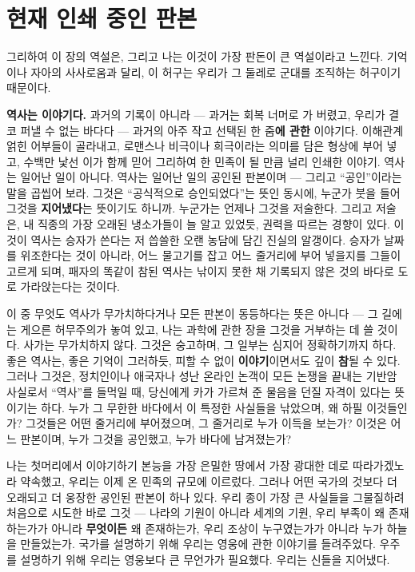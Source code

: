 \section*{현재 인쇄 중인 판본}

그리하여 이 장의 역설은, 그리고 나는 이것이 가장 판돈이 큰 역설이라고 느낀다. 기억이나 자아의 사사로움과 달리, 이 허구는 우리가 그 둘레로 군대를 조직하는 허구이기 때문이다.

\textbf{역사는 이야기다.} 과거의 기록이 아니라 — 과거는 회복 너머로 가 버렸고, 우리가 결코 퍼낼 수 없는 바다다 — 과거의 아주 작고 선택된 한 줌\textbf{에 관한} 이야기다. 이해관계 얽힌 어부들이 골라내고, 로맨스나 비극이나 희극이라는 의미를 담은 형상에 부어 넣고, 수백만 낯선 이가 함께 믿어 그리하여 한 민족이 될 만큼 널리 인쇄한 이야기. 역사는 일어난 일이 아니다. 역사는 일어난 일의 공인된 판본이며 — 그리고 ``공인''이라는 말을 곱씹어 보라. 그것은 ``공식적으로 승인되었다''는 뜻인 동시에, 누군가 붓을 들어 그것을 \textbf{지어냈다}는 뜻이기도 하니까. 누군가는 언제나 그것을 저술한다. 그리고 저술은, 내 직종의 가장 오래된 냉소가들이 늘 알고 있었듯, 권력을 따르는 경향이 있다. 이것이 역사는 승자가 쓴다는 저 씁쓸한 오랜 농담에 담긴 진실의 알갱이다. 승자가 날짜를 위조한다는 것이 아니라, 어느 물고기를 잡고 어느 줄거리에 부어 넣을지를 그들이 고르게 되며, 패자의 똑같이 참된 역사는 낚이지 못한 채 기록되지 않은 것의 바다로 도로 가라앉는다는 것이다.

이 중 무엇도 역사가 무가치하다거나 모든 판본이 동등하다는 뜻은 아니다 — 그 길에는 게으른 허무주의가 놓여 있고, 나는 과학에 관한 장을 그것을 거부하는 데 쓸 것이다. 사가는 무가치하지 않다. 그것은 숭고하며, 그 일부는 심지어 정확하기까지 하다. 좋은 역사는, 좋은 기억이 그러하듯, 피할 수 없이 \textbf{이야기}이면서도 깊이 \textbf{참}될 수 있다. 그러나 그것은, 정치인이나 애국자나 성난 온라인 논객이 모든 논쟁을 끝내는 기반암 사실로서 ``역사''를 들먹일 때, 당신에게 카가 가르쳐 준 물음을 던질 자격이 있다는 뜻이기는 하다. 누가 그 무한한 바다에서 이 특정한 사실들을 낚았으며, 왜 하필 이것들인가? 그것들은 어떤 줄거리에 부어졌으며, 그 줄거리로 누가 이득을 보는가? 이것은 어느 판본이며, 누가 그것을 공인했고, 누가 바다에 남겨졌는가?

나는 첫머리에서 이야기하기 본능을 가장 은밀한 땅에서 가장 광대한 데로 따라가겠노라 약속했고, 우리는 이제 온 민족의 규모에 이르렀다. 그러나 어떤 국가의 것보다 더 오래되고 더 웅장한 공인된 판본이 하나 있다. 우리 종이 가장 큰 사실들을 그물질하려 처음으로 시도한 바로 그것 — 나라의 기원이 아니라 세계의 기원, 우리 부족이 왜 존재하는가가 아니라 \textbf{무엇이든} 왜 존재하는가, 우리 조상이 누구였는가가 아니라 누가 하늘을 만들었는가. 국가를 설명하기 위해 우리는 영웅에 관한 이야기를 들려주었다. 우주를 설명하기 위해 우리는 영웅보다 큰 무언가가 필요했다. 우리는 신들을 지어냈다.

